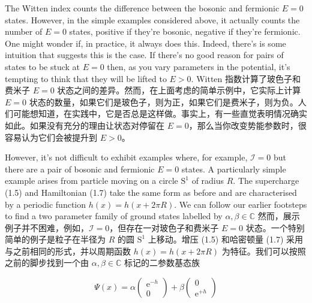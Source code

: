 \documentclass{ctexart}
\newcommand{\rme}{\mathrm{e}}
\begin{document}
\begin{paracol}{2}
The Witten index counts the difference between the bosonic and fermionic $E = 0$ states. However, in the simple examples considered above, it actually counts the number of $E = 0$ states, positive if they're bosonic, negative if they're fermionic. One might wonder if, in practice, it always does this. Indeed, there's is some intuition that suggests this is the case. If there's no good reason for pairs of states to be stuck at $E = 0$ then, as you vary parameters in the potential, it's tempting to think that they will be lifted to $E > 0$.
\switchcolumn
Witten 指数计算了玻色子和费米子 $E = 0$ 状态之间的差异。然而，在上面考虑的简单示例中，它实际上计算 $E = 0$ 状态的数量，如果它们是玻色子，则为正，如果它们是费米子，则为负。人们可能想知道，在实践中，它是否总是这样做。事实上，有一些直觉表明情况确实如此。如果没有充分的理由让状态对停留在 $E = 0$，那么当你改变势能参数时，很容易认为它们会被提升到 $E > 0$。
\switchcolumn*

However, it's not diﬃcult to exhibit examples where, for example, $\mathcal{I} = 0$ but there are a pair of bosonic and fermionic $E = 0$ states. A particularly simple example arises from particle moving on a circle $\mathrm{S}^1$ of radius $R$. The supercharge (1.5) and Hamiltonian (1.7) take the same form as before and are characterised by a periodic function $h(x) = h(x + 2 \pi R)$. We can follow our earlier footsteps to find a two parameter family of ground states labelled by $\alpha, \beta \in \mathbb{C}$
\switchcolumn
然而，展示例子并不困难，例如，$\mathcal{I} = 0$，但存在一对玻色子和费米子 $E = 0$ 状态。一个特别简单的例子是粒子在半径为 $R$ 的圆 $\mathrm{S}^1$ 上移动。增压 (1.5) 和哈密顿量 (1.7) 采用与之前相同的形式，并以周期函数 $h(x) = h(x + 2 \pi R)$ 为特征。我们可以按照之前的脚步找到一个由 $\alpha, \beta \in \mathbb{C}$ 标记的二参数基态族
\end{paracol}

\[ \Psi(x) = \alpha \begin{pmatrix}
        \rme^{- h} \\ 0
    \end{pmatrix} + \beta \begin{pmatrix}
        0 \\ \rme^{+ h}
    \end{pmatrix} \]
\end{document}
